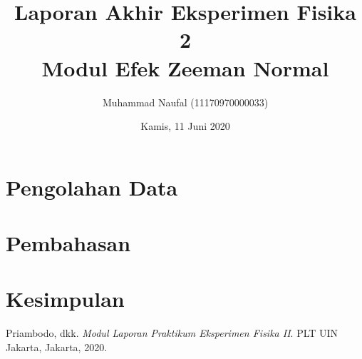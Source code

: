 \documentclass{article}
\title{Laporan Akhir Eksperimen Fisika 2\\
Modul Efek Zeeman Normal}
\author{ Muhammad Naufal (11170970000033) }
\date{ Kamis, 11 Juni 2020 }
\begin{document}
	\maketitle

	\section{Pengolahan Data}
	
	\section{Pembahasan}

	\section{Kesimpulan}

	\begin{thebibliography}{9}
		Priambodo, dkk. 
		\textit{Modul Laporan Praktikum Eksperimen Fisika II}. 
		PLT UIN Jakarta, Jakarta, 2020.
	\end{thebibliography}
	
\end{document}
